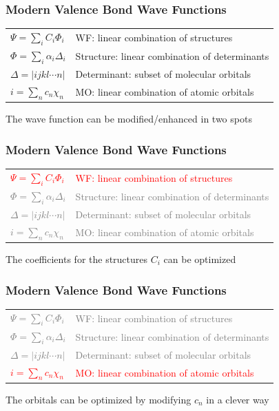 \documentclass[]{beamer}
\begin{document}
\begin{frame}
  \frametitle{Modern Valence Bond Wave Functions}
  \begin{tabular}{ll}
    $\Psi = \sum_{i} C_i \Phi_i$ & WF: linear combination of structures \\
    $\Phi = \sum_{i} \alpha_i \Delta_i$ & Structure: linear combination of determinants \\
    $\Delta = |ijkl \cdots n|$ & Determinant: subset of molecular orbitals \\
    $i = \sum_{n} c_n \chi_n$ & MO: linear combination of atomic orbitals
  \end{tabular}
  \vspace{15px}
  \begin{center}
    The wave function can be modified/enhanced in two spots
  \end{center}
\end{frame}

\begin{frame}
  \frametitle{Modern Valence Bond Wave Functions}
  \begin{tabular}{ll}
    \textcolor{red}{$\Psi = \sum_{i} C_i \Phi_i$} & \textcolor{red}{WF: linear combination of structures} \\
    \textcolor{gray}{$\Phi = \sum_{i} \alpha_i \Delta_i$} & \textcolor{gray}{Structure: linear combination of determinants} \\
    \textcolor{gray}{$\Delta = |ijkl \cdots n|$} & \textcolor{gray}{Determinant: subset of molecular orbitals} \\
    \textcolor{gray}{$i = \sum_{n} c_n \chi_n$} & \textcolor{gray}{MO: linear combination of atomic orbitals}
  \end{tabular}
  \vspace{15px}
  \begin{center}
    The coefficients for the structures $C_i$ can be optimized
  \end{center}
\end{frame}

\begin{frame}
  \frametitle{Modern Valence Bond Wave Functions}
  \begin{tabular}{ll}
    \textcolor{gray}{$\Psi = \sum_{i} C_i \Phi_i$} & \textcolor{gray}{WF: linear combination of structures} \\
    \textcolor{gray}{$\Phi = \sum_{i} \alpha_i \Delta_i$} & \textcolor{gray}{Structure:  linear combination of determinants} \\
    \textcolor{gray}{$\Delta = |ijkl \cdots n|$} & \textcolor{gray}{Determinant: subset of molecular orbitals} \\
    \textcolor{red}{$i = \sum_{n} c_n \chi_n$} & \textcolor{red}{MO: linear combination of atomic orbitals}
  \end{tabular}
  \vspace{15px}
  \begin{center}
    The orbitals can be optimized by modifying $c_n$ in a clever way
  \end{center}
\end{frame}
\end{document}
